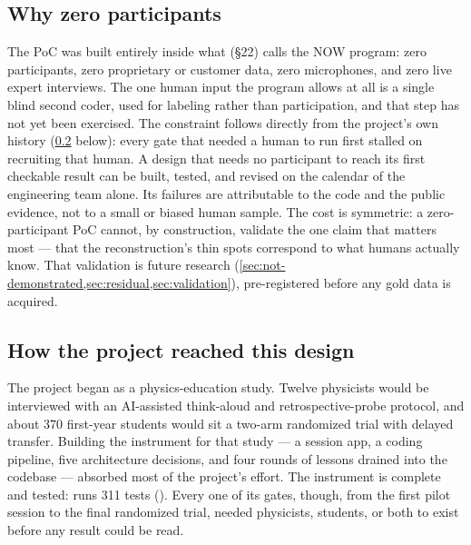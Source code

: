 \subsection{Why zero participants}

The PoC was built entirely inside what  (\S22) calls the NOW program:
zero participants, zero proprietary or customer data, zero microphones, and zero live expert
interviews. \evobs{} The one human input the program allows at all is a single blind second
coder, used for labeling rather than participation, and that step has not yet been exercised.
The constraint follows directly from the project's own history (\cref{sec:track-a-history}
below): every gate that needed a human to run first stalled on recruiting that human. A design
that needs no participant to reach its first checkable result can be built, tested, and revised
on the calendar of the engineering team alone. Its failures are attributable to the code and
the public evidence, not to a small or biased human sample. \evint{} The cost is symmetric: a
zero-participant PoC cannot, by construction, validate the one claim that matters most --- that
the reconstruction's thin spots correspond to what humans actually know. That validation is
future research (\cref{sec:not-demonstrated,sec:residual,sec:validation}), pre-registered before
any gold data is acquired.

\subsection{How the project reached this design}
\label{sec:track-a-history}

The project began as a physics-education study. Twelve physicists would be interviewed with an
AI-assisted think-aloud and retrospective-probe protocol, and about 370 first-year students would
sit a two-arm randomized trial with delayed transfer. Building the instrument for that study --- a
session app, a coding pipeline, five architecture decisions, and four rounds of lessons drained
into the codebase --- absorbed most of the project's effort. \evobs{} The instrument is complete
and tested:  runs 311 tests ().
Every one of its gates, though, from the first pilot session to the final randomized trial,
needed physicists, students, or both to exist before any result could be read.


